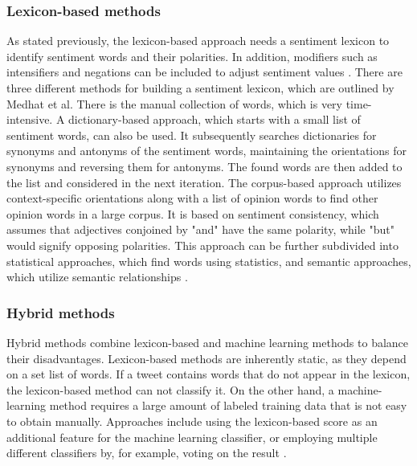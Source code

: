 \subsubsection{Lexicon-based methods}
\label{sub:fund_lex}
As stated previously, the lexicon-based approach needs a sentiment lexicon to identify sentiment words and their polarities. In addition, modifiers such as intensifiers and negations can be included to adjust sentiment values \cite{liu_2015}. There are three different methods for building a sentiment lexicon, which are outlined by Medhat et al. There is the manual collection of words, which is very time-intensive. A dictionary-based approach, which starts with a small list of sentiment words, can also be used. It subsequently searches dictionaries for synonyms and antonyms of the sentiment words, maintaining the orientations for synonyms and reversing them for antonyms. The found words are then added to the list and considered in the next iteration. The corpus-based approach utilizes context-specific orientations along with a list of opinion words to find other opinion words in a large corpus. It is based on sentiment consistency, which assumes that adjectives conjoined by "and" have the same polarity, while "but" would signify opposing polarities. This approach can be further subdivided into statistical approaches, which find words using statistics, and semantic approaches, which utilize semantic relationships \cite{MEDHAT20141093}.

\subsubsection{Hybrid methods}

Hybrid methods combine lexicon-based and machine learning methods to balance their disadvantages. Lexicon-based methods are inherently static, as they depend on a set list of words. If a tweet contains words that do not appear in the lexicon, the lexicon-based method can not classify it. On the other hand, a machine-learning method requires a large amount of labeled training data that is not easy to obtain manually. Approaches include using the lexicon-based score as an additional feature for the machine learning classifier, or employing multiple different classifiers by, for example, voting on the result \cite{DBLP:journals/csur/GiachanouC16}.


